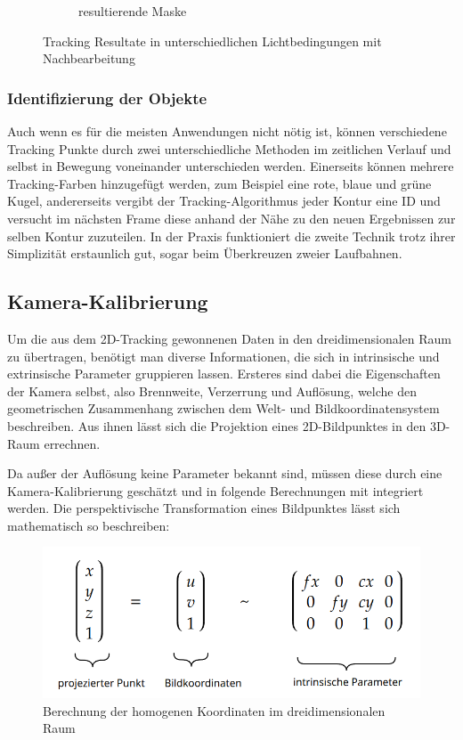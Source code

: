 \documentclass[12pt, ngerman]{article}
\begin{document}
\begin{figure}[htbp!]
\begin{subfigure}[t]{0.6\textwidth}
      \caption{resultierende Maske}
      \label{Abb: 2d-color-maske}
  \end{subfigure}
  \caption{Tracking Resultate in unterschiedlichen Lichtbedingungen mit Nachbearbeitung}
  \label{Abb: Nachbearbeitungen}
\end{figure}

\subsubsection{Identifizierung der Objekte}
Auch wenn es für die meisten Anwendungen nicht nötig ist, können verschiedene Tracking Punkte durch zwei unterschiedliche Methoden im zeitlichen Verlauf und selbst in Bewegung voneinander unterschieden werden. Einerseits können mehrere Tracking-Farben hinzugefügt werden, zum Beispiel eine rote, blaue und grüne Kugel, andererseits vergibt der Tracking-Algorithmus jeder Kontur eine ID und versucht im nächsten Frame diese anhand der Nähe zu den neuen Ergebnissen zur selben Kontur zuzuteilen. In der Praxis funktioniert die zweite Technik trotz ihrer Simplizität erstaunlich gut, sogar beim Überkreuzen zweier Laufbahnen.  

\subsection{Kamera-Kalibrierung}
Um die aus dem 2D-Tracking gewonnenen Daten in den dreidimensionalen Raum zu übertragen, benötigt man diverse Informationen, die sich in intrinsische und extrinsische Parameter gruppieren lassen. Ersteres sind dabei die Eigenschaften der Kamera selbst, also Brennweite, Verzerrung und Auflösung, welche den geometrischen Zusammenhang zwischen dem Welt- und Bildkoordinatensystem beschreiben. Aus ihnen lässt sich die Projektion eines 2D-Bildpunktes in den 3D-Raum errechnen. 

Da außer der Auflösung keine Parameter bekannt sind, müssen diese durch eine Kamera-Kalibrierung geschätzt und in folgende Berechnungen mit integriert werden. Die perspektivische Transformation eines Bildpunktes lässt sich mathematisch so beschreiben:
\begin{figure}[hbtp!]
    \includegraphics[width=\textwidth]{camera_matrix.png}
    \caption{Berechnung der homogenen Koordinaten im dreidimensionalen Raum}
    \label{Abb: camera_matrix}
\end{figure}
\end{document}
